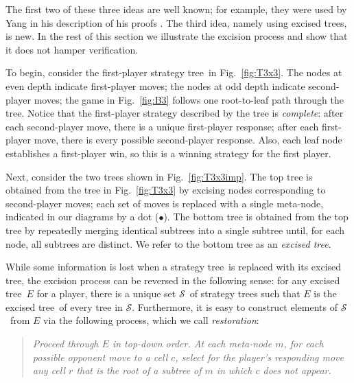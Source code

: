 \documentclass{llncs}
\def\stt{strategy tree}
\def\exct{excised tree}
\def\calS{\mbox{$\mathcal S$}}
\begin{document}
The first two of these three ideas are well known;
for example, they were used by Yang in his description
of his proofs \cite{Yang01,Yang02a,Yang02b,Yang03}.
The third idea, namely using \exct s, is new.
In the rest of this section we
illustrate the excision process and
show that it does not hamper verification.



To begin, consider the first-player \stt\ in Fig.~\ref{fig:T3x3}.
The nodes at even depth indicate first-player moves;
the nodes at odd depth indicate second-player moves;
the game in Fig.~\ref{fig:B3} 
follows one root-to-leaf path through the tree.
Notice that the first-player strategy
described by the tree is {\it complete}:
after each second-player move,
there is a unique first-player response;
after each first-player move,
there is every possible second-player response.
Also,
each leaf node establishes a first-player win,
so this is a winning strategy for the first player.



Next, consider the two trees shown in Fig.~\ref{fig:T3x3imp}.
The top tree is obtained from the tree in Fig.~\ref{fig:T3x3}
by excising nodes corresponding to second-player moves;
each set of moves is replaced with a single meta-node,
indicated in our diagrams by a dot ($\bullet$).
The bottom tree is obtained from the top tree
by repeatedly merging identical subtrees into a single subtree
until, for each node, all subtrees are distinct.
We refer to the bottom tree as an {\it \exct}.

While some information is lost when a \stt\ is replaced with its \exct,
the excision process can be reversed in the following sense:
for any \exct\ $E$ for a player, 
there is a unique set \calS\ of \stt s 
such that $E$ is the \exct\ of every tree in \calS.
Furthermore, it is easy to construct elements of \calS\ from $E$
via the following process, which we call {\it restoration}:

\begin{quotation}{\it
\noindent
Proceed through $E$ in top-down order. At each meta-node $m$,
for each possible opponent move to a cell $c$,
select for the player's responding move any cell $r$
that is the root of a subtree of $m$ in which $c$ does not appear.
}\end{quotation}
\end{document}
